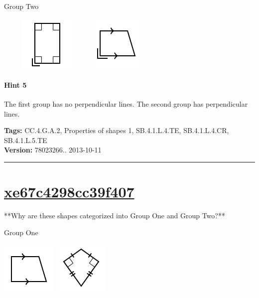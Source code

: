 \documentclass[twocolumn,10pt]{article}
\def\shrinkfactor{0.55}
\begin{document}
Group Two

$\phantom{xxxx}$
\includegraphics[scale=\shrinkfactor]{figures/d6d791274da0b0e2e00f611eecdc6fbff3b6f565.png}
$\phantom{xxxx}$
\includegraphics[scale=\shrinkfactor]{figures/b40fe0d71041d95a6048607b1a3b833ea4457558.png}

\paragraph{Hint 5}The first group has no perpendicular lines.  The second group has perpendicular lines.



\medskip
\noindent
\textbf{Tags:} {\footnotesize CC.4.G.A.2, Properties of shapes 1, SB.4.1.L.4.TE, SB.4.1.L.4.CR, SB.4.1.L.5.TE}\\
\textbf{Version:} 78023266.. 2013-10-11
\smallskip\hrule





\section{\href{https://www.khanacademy.org/devadmin/content/items/xe67c4298cc39f407}{xe67c4298cc39f407}}

\noindent
**Why are these shapes categorized into Group One and Group Two?** 

Group One 

 
\includegraphics[scale=\shrinkfactor]{figures/53c957e1607d463070480943456fd8435ab45b5d.png} 
\includegraphics[scale=\shrinkfactor]{figures/be0b4c8e85edc438c12910c91d66875e8fcd2372.png}
\end{document}
